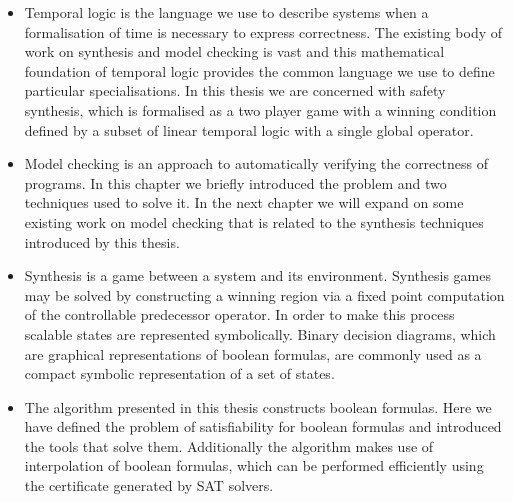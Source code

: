 \begin{itemize}

    \item Temporal logic is the language we use to describe systems when a formalisation of time is necessary to express correctness. The existing body of work on synthesis and model checking is vast and this mathematical foundation of temporal logic provides the common language we use to define particular specialisations. In this thesis we are concerned with safety synthesis, which is formalised as a two player game with a winning condition defined by a subset of linear temporal logic with a single global operator.

    \item Model checking is an approach to automatically verifying the correctness of programs. In this chapter we briefly introduced the problem and two techniques used to solve it. In the next chapter we will expand on some existing work on model checking that is related to the synthesis techniques introduced by this thesis.

    \item Synthesis is a game between a system and its environment. Synthesis games may be solved by constructing a winning region via a fixed point computation of the controllable predecessor operator. In order to make this process scalable states are represented symbolically. Binary decision diagrams, which are graphical representations of boolean formulas, are commonly used as a compact symbolic representation of a set of states.

    \item The algorithm presented in this thesis constructs boolean formulas. Here we have defined the problem of satisfiability for boolean formulas and introduced the tools that solve them. Additionally the algorithm makes use of interpolation of boolean formulas, which can be performed efficiently using the certificate generated by SAT solvers.

\end{itemize}
